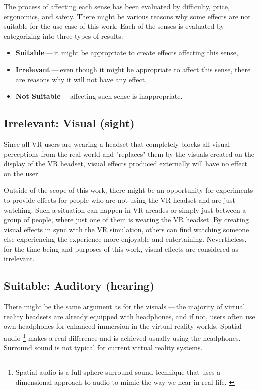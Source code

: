 The process of affecting each sense has been evaluated by difficulty,
price, ergonomics, and safety. There might be various reasons why some
effects are not suitable for the use-case of this work.
Each of the senses is evaluated by categorizing into three types of results:


\begin{itemize}

\item \textbf{Suitable} — it might be appropriate to create effects affecting this sense,

\item \textbf{Irrelevant} — even though it might be appropriate to affect this sense,
there are reasons why it will not have any effect,

\item \textbf{Not Suitable} — affecting such sense is inappropriate.

\end{itemize}


\hypertarget{x-irrelevant:-visual-(sight)}{\subsection{Irrelevant: Visual (sight)}}
Since all VR users are wearing a headset that completely blocks
all visual perceptions from the real world and "replaces" them by the visuals
created on the display of the VR headset, visual effects produced externally
will have no effect on the user.


Outside of the scope of this work, there might be an opportunity for experiments
to provide effects for people who are not using the VR headset and are
just watching. Such a situation can happen in VR arcades or simply
just between a group of people, where just one of them is wearing the VR headset.
By creating visual effects in sync with the VR
simulation, others can find watching someone else experiencing the experience
more enjoyable and entertaining. Nevertheless, for the time being and purposes
of this work, visual effects are considered as irrelevant.


\hypertarget{x-suitable:-auditory-(hearing)}{\subsection{Suitable: Auditory (hearing)}}
There might be the same argument as for the visuals — the majority of virtual reality headsets are already equipped with
headphones, and if not, users often use own headphones for
enhanced immersion in the virtual reality worlds.
Spatial audio
\footnote{Spatial audio is a full sphere surround-sound technique that uses a dimensional approach to audio to mimic the way we hear in real life. \hyperlink{spaudio}{}}
makes a real difference and is achieved usually using the headphones.
Surround sound is not typical for current virtual reality systems.



